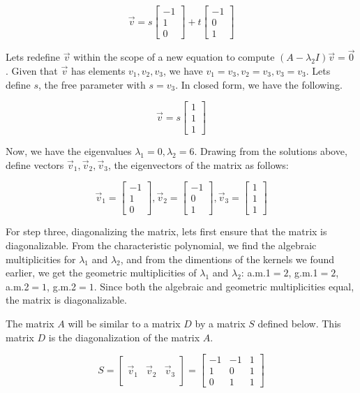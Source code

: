 \documentclass[11pt]{article}
\begin{document}
$$\vec{v}=s\begin{bmatrix}
-1\\
1\\
0
\end{bmatrix}+t\begin{bmatrix}
-1\\
0\\
1
\end{bmatrix}$$

Lets redefine $\vec{v}$ within the scope of a new equation to compute $(A-\lambda_2I)\vec{v}=\vec{0}$. Given that $\vec{v}$ has elements $v_1,v_2,v_3$, we have $v_1=v_3,v_2=v_3,v_3=v_3$. Lets define $s$, the free parameter with $s=v_3$. In closed form, we have the following.

$$\vec{v}=s\begin{bmatrix}1\\1\\1\end{bmatrix}$$

Now, we have the eigenvalues $\lambda_1=0,\lambda_2=6$. Drawing from the solutions above, define vectors $\vec{v}_1,\vec{v}_2,\vec{v}_3$, the eigenvectors of the matrix as follows:

$$\vec{v}_1=\begin{bmatrix}-1\\1\\0\end{bmatrix},
\vec{v}_2=\begin{bmatrix}-1\\0\\1\end{bmatrix},
\vec{v}_3=\begin{bmatrix}1\\1\\1\end{bmatrix}$$

For step three, diagonalizing the matrix, lets first ensure that the matrix is diagonalizable. From the characteristic polynomial, we find the algebraic multiplicities for $\lambda_1$ and $\lambda_2$, and from the dimentions of the kernels we found earlier, we get the geometric multiplicities of $\lambda_1$ and $\lambda_2$: a.m.1$=2$, g.m.1$=2$, a.m.2$=1$, g.m.2$=1$. Since both the algebraic and geometric multiplicities equal, the matrix is diagonalizable.

The matrix $A$ will be similar to a matrix $D$ by a matrix $S$ defined below. This matrix $D$ is the diagonalization of the matrix $A$.

$$S=\begin{bmatrix} & & \\\vec{v}_1 & \vec{v}_2 & \vec{v}_3\\ & & \end{bmatrix}=
\begin{bmatrix}-1 & -1 & 1\\1 & 0 & 1\\0 & 1 & 1\end{bmatrix}$$
\end{document}

